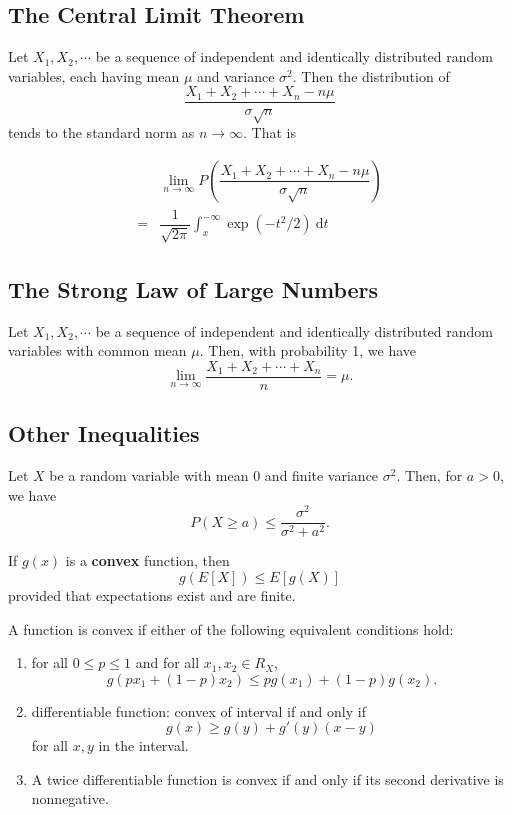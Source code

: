 \subsection{The Central Limit Theorem}

Let \(X_1, X_2, \cdots\) be a sequence of independent and identically
distributed random variables, each having mean \(\mu\) and variance
\(\sigma^2\). Then the distribution of 
\[\dfrac{X_1+X_2+\cdots+X_n-n\mu}{\sigma\sqrt{n}}\]
tends to the standard norm as \(n \rightarrow \infty\). That is 

\begin{align*}
&\lim\limits_{n\rightarrow
\infty}P\left(\dfrac{X_1+X_2+\cdots+X_n-n\mu}{\sigma\sqrt{n}}\right) \\ 
  =&\dfrac{1}{\sqrt{2\pi}}\int_{x}^{-\infty}\exp(-t^2/2)\ \mathrm{d}t
\end{align*}

\subsection{The Strong Law of Large Numbers}

 Let \(X_1, X_2, \cdots\)
be a sequence of independent and identically distributed random variables with
common mean \(\mu\). Then, with probability 1, we have
\[\lim\limits_{n\rightarrow\infty}\dfrac{X_1+X_2+\cdots+X_n}{n}=\mu.\]


\subsection{Other Inequalities}

 Let \(X\) be a
random variable with mean \(0\) and finite variance \(\sigma^2\). Then, for
\(a > 0\), we have
\[P(X \geq a) \leq \dfrac{\sigma^2}{\sigma^2+a^2}.\]

 If \(g(x)\) is a \textbf{convex}
function, then 
\[g(E[X]) \leq E[g(X)]\]
provided that expectations exist and are finite.

A function is convex if either of the following equivalent conditions hold:
\begin{enumerate}
  \item for all \(0 \leq p \leq 1\) and for all \(x_1, x_2 \in R_X\), 
    \[g(px_1 + (1-p)x_2)\leq pg(x_1) + (1-p)g(x_2).\]
  \item differentiable function: convex of interval if and only if 
    \[g(x) \geq g(y) + g'(y)(x-y)\]
    for all \(x, y\) in the interval.
  \item A twice differentiable function is convex if and only if its second
    derivative is nonnegative.
\end{enumerate}

